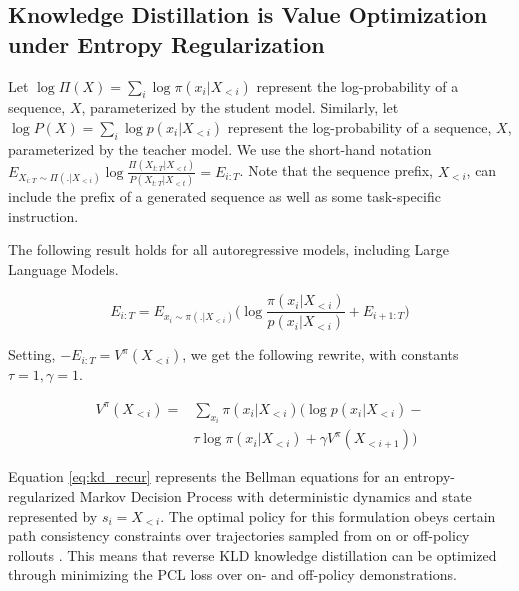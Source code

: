\subsection{Knowledge Distillation is Value Optimization under Entropy Regularization}
\label{sec:KD_derive}

Let $\log \Pi(X) = \sum_i \log \pi(x_i|X_{<i})$
represent the log-probability of a sequence,
$X$, parameterized by the student model. Similarly, let
$\log P(X) = \sum_i \log p(x_i|X_{<i})$
represent the log-probability of a sequence, $X$, parameterized by the teacher model.
We use the short-hand notation
$E_{X_{i:T} \sim \Pi(.|X_{<i})} \log \frac{\Pi(X_{t:T}|X_{<t})}{P(X_{t:T}|X_{<t})} = E_{i:T}$. 
Note that the sequence prefix, $X_{<i}$, can include the prefix of a generated sequence as well as some task-specific instruction.

The following result holds for all autoregressive models, including Large Language Models.

\begin{equation}
    E_{i:T} = E_{x_i \sim \pi(.|X_{<i})} \Big(\log \frac{\pi(x_i|X_{<i})}{p(x_i|X_{<i})} + E_{i + 1:T}\Big)
    \label{eq:exp_recur}
\end{equation}

Setting, $-E_{i:T} = V^{\pi}(X_{<i})$, we get the following rewrite, with constants $\tau=1,\gamma=1$.

\begin{align}
    V^{\pi}(X_{<i}) = &\sum_{x_i} \pi(x_i|X_{<i})\Big(\log p(x_i|X_{<i}) - \nonumber \\
    &\tau \log \pi(x_i|X_{<i}) + \gamma V^{\pi}(X_{<i + 1})\Big) \label{eq:kd_recur}
\end{align}

Equation \ref{eq:kd_recur} represents the Bellman equations for an entropy-regularized Markov Decision Process with deterministic dynamics and state represented by $s_i = X_{<i}$.  The optimal policy for this formulation obeys certain path consistency constraints over trajectories sampled from on or off-policy rollouts \cite{DBLP:journals/corr/NachumNXS17}. This means that reverse KLD knowledge distillation can be optimized through minimizing the PCL loss over on- and off-policy demonstrations.

